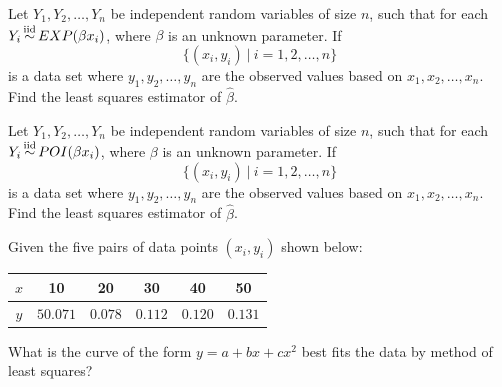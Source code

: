 \begin{mdframed}
    \vspace{-0.25cm}
    \hspace{-0.25cm}
    \begin{Exercise}
        Let $Y_1, Y_2, \ldots, Y_n$ be independent random variables of size $n$, such that for each 
        $Y_i \operatorname*{\overset{\text{iid}}{\sim}} EXP(\beta x_i)$, where $\beta$ is an unknown parameter. If 
        \[
            \{(x_i, y_i) \> | \> i = 1, 2, \ldots, n \}
        \]
        is a data set where $y_1, y_2, \ldots, y_n$ are 
        the observed values based on $x_1, x_2, \ldots, x_n$. Find the least squares estimator 
        of $\hat{\beta}$.
    \end{Exercise}

    \begin{Exercise}
        Let $Y_1, Y_2, \ldots, Y_n$ be independent random variables of size $n$, such that for each 
        $Y_i \operatorname*{\overset{\text{iid}}{\sim}} POI(\beta x_i)$, where $\beta$ is an unknown parameter. If 
        \[
            \{(x_i, y_i) \> | \> i = 1, 2, \ldots, n \}
        \]
        is a data set where $y_1, y_2, \ldots, y_n$ are 
        the observed values based on $x_1, x_2, \ldots, x_n$. Find the least squares estimator 
        of $\hat{\beta}$.
    \end{Exercise}

    \begin{Exercise}
        Given the five pairs of data points $(x_i, y_i)$ shown below:
        \begin{center}
            \begin{tabular}{c|c|c|c|c|c}
            $x$ & 10 & 20 & 30 & 40 & 50\\
            \hline
            $y$ & $50.071$ & $0.078$ & $0.112$ & $0.120$ & $0.131$\\
            \end{tabular}
        \end{center}
        What is the curve of the form $y = a + bx + cx^2$ best fits the data by method of least squares?
    \end{Exercise}
\end{mdframed}